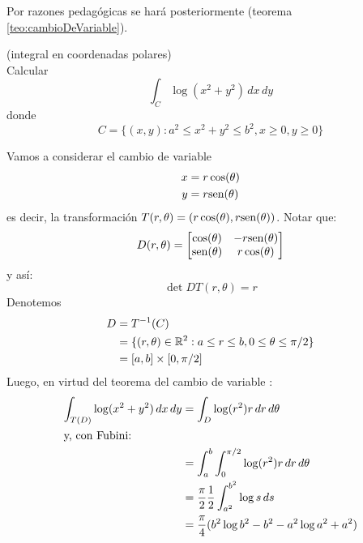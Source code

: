 
\begin{demostracion}
Por razones pedag\'ogicas se har\'a posteriormente (teorema \ref{teo:cambioDeVariable}).
\end{demostracion}

\begin{ejemplo}{\rm (integral en coordenadas polares)}
\\Calcular
\[ \int_C \log(x^2+y^2) \, dx \, dy \]
donde
\[ C = \{(x,y) : a^2 \leq x^2 + y^2 \leq b^2, x \geq 0, y \geq 0
\} \]
\begin{solucion}
Vamos a considerar el cambio de variable
\begin{align*}
x &= r \cos(\theta) \\
y &= r \text{sen}(\theta)
\end{align*}
es decir, la transformaci\'on $ T(r,\theta) = (r \cos(\theta), r \text{sen}(\theta) ) $. Notar que:
\[
D(r,\theta) =
    \begin{bmatrix}
        \cos(\theta) & - r \text{sen}(\theta) \\
        \text{sen}(\theta) &   r \cos(\theta)
    \end{bmatrix}
\]
y as\'i:
\[
    \det DT(r,\theta) = r 
\]
Denotemos
\begin{align*}
D &= T^{-1}(C) \\
    &= \{ (r,\theta) \in \mathbb{R}^2 : a \leq r \leq b, 0 \leq \theta
    \leq \pi / 2 \} \\
    &= [a,b] \times [0,\pi /2 ]
\end{align*}
Luego, en virtud del teorema del cambio de variable :
\begin{align*}
\int_{T(D)} \log(x^2 + y^2) \, dx \, dy
    &= \int_D \log(r^2) r \, dr \, d\theta \\
\intertext{y, con Fubini:}
    &= \int_a^b \int_0^{\pi/2} \log (r^2) r \, dr \, d\theta \\
    &= \frac{\pi}{2}\frac{1}{2} \int_{a^2}^{b^2} \log s \, ds \\
    &= \frac{\pi}{4} (b^2 \log b^2 - b^2 - a^2 \log a^2 + a^2)
\end{align*}
\end{solucion}
\end{ejemplo}

